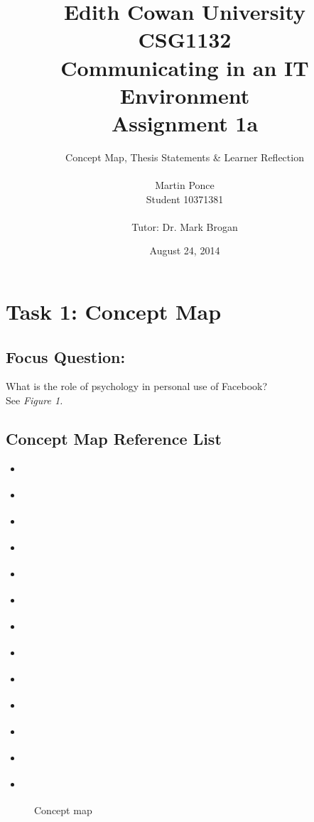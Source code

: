 \documentclass[12pt,a4paper]{report}
\title{Edith Cowan University\\CSG1132\\Communicating in an IT Environment\\Assignment 1a}
\author{Concept Map, Thesis Statements \& Learner Reflection\\\\
		Martin Ponce\\Student 10371381\\\\Tutor: Dr. Mark Brogan}
\date{August 24, 2014}
\begin{document}
\maketitle

\tableofcontents

\newpage
\section*{\textsf{Task 1: Concept Map}}

\subsection*{\textsf{Focus Question:}}
What is the role of psychology in personal use of Facebook?\\

See \emph{Figure 1.}

\subsection*{\textsf{Concept Map Reference List}}
\begin{itemize}
\item \citet*{Pai2013}
\item \citet*{McAndrew2012}
\item \citet*{Nadkarni2012}
\item \citet*{Moore2012}
\item \citet*{Ross2009}
\item \citet*{Toma2013}
\item \citet*{Ellison2007}
\item \citet*{Park2011}
\item \citet*{Anderson2012}
\item \citet*{Ku2013}
\item \citet*{Rosen2013}
\item \citet*{Trottier2012}
\item \citet*{Kwan2013}
\end{itemize}

\newpage
\begin{landscape}
	\begin{figure} %
		\centering
		\caption{Concept map}
	\end{figure}
	
\end{landscape}
\end{document}
